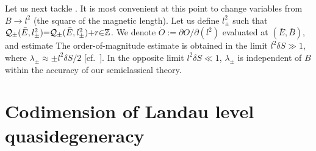 \documentclass[aps, prb, showpacs, twocolumn, notitlepage, superscriptaddress]{revtex4-1}
\begin{document}
Let us next tackle . It is most convenient at this point to change variables from $B\rightarrow l^2$ (the square of the magnetic length). Let us  define   $l^2_{\pm}$ such that ${\cal Q}_{\pm}(\bar{E},l^2_{\pm}){=}{\cal Q}_{\pm}(\bar{E},l^2_{\pm}){+}r{\in} \mathbb{Z}$. We denote  $\dot{O}:=\partial O/\partial(l^2)$ evaluated at $(\bar{E},\bar{B})$, and estimate
The order-of-magnitude estimate is obtained in the limit $l^2\delta S \gg 1$, where $\lambda_{\pm}\approx \pm l^2\delta S/2$ [cf.\ ]. In the opposite limit $l^2\delta S \ll 1$, $\lambda_{\pm}$ is independent of $B$ within the accuracy of our semiclassical theory.    

\section{Codimension of Landau level quasidegeneracy}\label{app:codimension}
\end{document}
